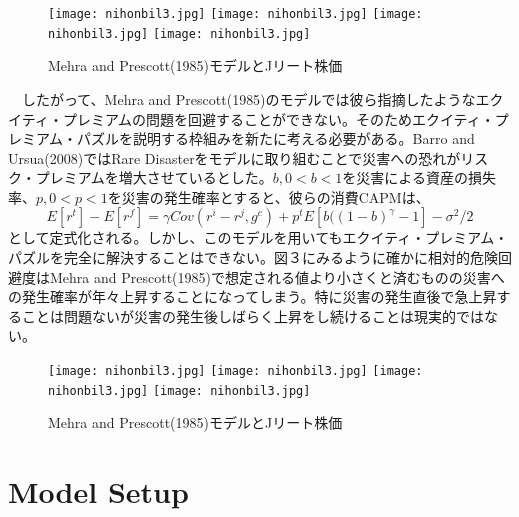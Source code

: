 \documentclass{jsarticle}
\begin{document}
\begin{figure}
\centering
\texttt{[image: nihonbil3.jpg]}
\texttt{[image: nihonbil3.jpg]}
\texttt{[image: nihonbil3.jpg]}
\texttt{[image: nihonbil3.jpg]}
\caption{Mehra and Prescott(1985)モデルとJリート株価}
\end{figure}


　したがって、Mehra and Prescott(1985)のモデルでは彼ら指摘したようなエクイティ・プレミアムの問題を回避することができない。そのためエクイティ・プレミアム・パズルを説明する枠組みを新たに考える必要がある。Barro and Ursua(2008)ではRare Disasterをモデルに取り組むことで災害への恐れがリスク・プレミアムを増大させているとした。$b, 0<b<1$を災害による資産の損失率、$p, 0<p<1$を災害の発生確率とすると、彼らの消費CAPMは、
$$E[r^{t}] - E[r^{f}] = \gamma Cov(r^{i} - r^{j}, g^{c}) + p^{t}E[b((1-b)^{\gamma} - 1] - \sigma^{2}/2 $$
として定式化される。しかし、このモデルを用いてもエクイティ・プレミアム・パズルを完全に解決することはできない。図３にみるように確かに相対的危険回避度はMehra and Prescott(1985)で想定される値より小さくと済むものの災害への発生確率が年々上昇することになってしまう。特に災害の発生直後で急上昇することは問題ないが災害の発生後しばらく上昇をし続けることは現実的ではない。

\begin{figure}
\centering
\texttt{[image: nihonbil3.jpg]}
\texttt{[image: nihonbil3.jpg]}
\texttt{[image: nihonbil3.jpg]}
\texttt{[image: nihonbil3.jpg]}
\caption{Mehra and Prescott(1985)モデルとJリート株価}
\end{figure}


\section{Model Setup}
\end{document}
